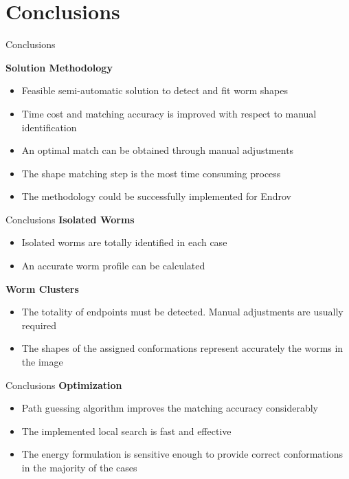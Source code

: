 \documentclass[xcolor=table]{beamer}
\begin{document}
\section{Conclusions}
\begin{frame}{Conclusions}

\textbf{Solution Methodology}
  \begin{itemize}
  \item Feasible semi-automatic solution to detect
    and fit worm shapes \pause
  \item Time cost and matching accuracy is improved
    with respect to manual identification \pause
  \item An optimal match can be obtained through
    manual adjustments \pause
  \item The shape matching step is the most
    time consuming process \pause
  \item The methodology could be successfully
    implemented for Endrov
  \end{itemize}

\end{frame}

\begin{frame}{Conclusions}
\textbf{Isolated Worms}
  \begin{itemize}
  \item Isolated worms are totally identified in
    each case \pause
  \item An accurate worm profile can be calculated
    \end{itemize}
    
\pause \textbf{Worm Clusters}
\begin{itemize}
  \item The totality of endpoints must be detected.
    Manual adjustments are usually required \pause
  \item The shapes of the assigned conformations 
    represent accurately the worms in the image
  \end{itemize}

\end{frame}


\begin{frame}{Conclusions}
\textbf{Optimization}
  \begin{itemize}
  \item Path guessing algorithm improves 
    the matching accuracy considerably \pause
  \item The implemented local search is fast and 
    effective \pause
  \item The energy formulation is sensitive enough
    to provide correct conformations in the majority
    of the cases
  \end{itemize}

\end{frame}
\end{document}
